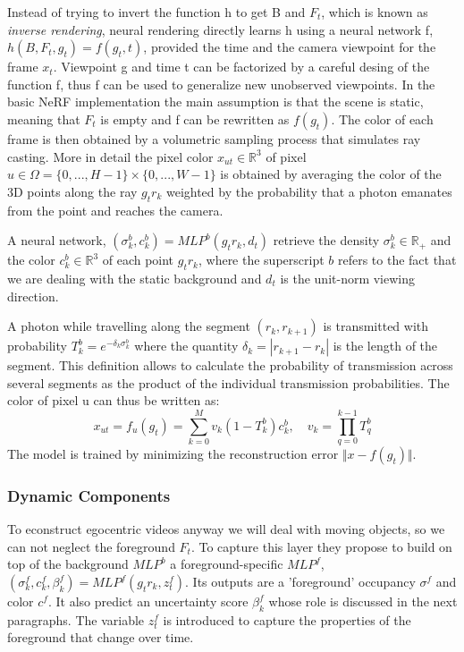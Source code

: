 Instead of trying to invert the function h to get B and $F_t$, which is known as \textit{inverse rendering},
neural rendering directly learns h using a neural network f, $h(B,F_t,g_t)=f(g_t,t)$, provided
the time and the camera viewpoint for the frame $x_t$. Viewpoint g and time t can be 
factorized by a careful desing of the function f, thus f can be used to generalize new unobserved
viewpoints. In the basic NeRF implementation the main assumption is that the scene is static,
meaning that $F_t$ is empty and f can be rewritten as $f(g_t)$. The color of each frame is then 
obtained by a volumetric sampling process that simulates ray casting. More in detail
the pixel color $x_{ut}\in \mathbb{R}^3$ of pixel $u \in \Omega = \{0,...,H-1\}\times\{0,...,W-1\}$ is obtained
by averaging the color of the 3D points along the ray $g_t r_k$ weighted by the probability
that a photon emanates from the point and reaches the camera.

A neural network, $(\sigma_k^b,c_k^b) = MLP^b(g_t r_k,d_t)$ retrieve the density 
$\sigma_k^b \in\mathbb{R}_{+}$ and the color $c_k^b \in \mathbb{R}^{3}$ of each point $g_t r_k$,
where the superscript $b$ refers to the fact that we are dealing with the static background and
$d_t$ is the unit-norm viewing direction.

A photon while travelling along the segment $(r_k,r_{k+1})$ is transmitted with probability
$T_k^b = e^{-\delta_k \sigma_k^b}$ where the quantity $\delta_k = |r_{k+1} - r_k|$ is the length of 
the segment. This definition allows to calculate the probability of transmission across several segments
as the product of the individual transmission probabilities. The color of pixel u can thus be written as:
\begin{equation}
    x_{ut} = f_u(g_t) = \sum_{k=0}^{M} v_k (1-T_k^b)c_k^b, \quad v_k = \prod_{q=0}^{k-1} T_q^b
\end{equation}
The model is trained by minimizing the reconstruction error $\Vert x - f(g_t)\Vert $.

\subsubsection{Dynamic Components}
To econstruct egocentric videos anyway we will deal with moving objects, so we can
not neglect the foreground $F_t$. To capture this layer they propose to build on top 
of the background $MLP^b$ a foreground-specific 
$MLP^f$,$(\sigma_k^f,c_k^f,\beta_k^f) = MLP^f(g_t r_k, z_t^f)$. Its outputs are a 'foreground'
occupancy $\sigma^f$ and color $c^f$. It also predict an uncertainty score $\beta_k^f$
whose role is discussed in the next paragraphs. The variable $z_t^f$ is introduced 
to capture the properties of the foreground that change over time.

